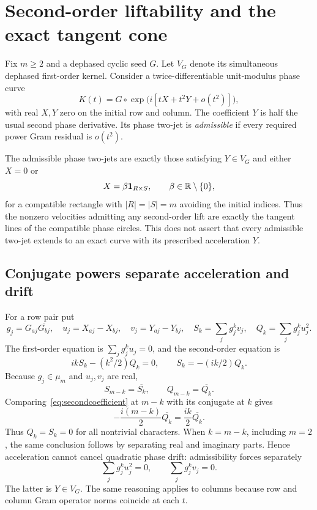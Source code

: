 \section{Second-order liftability and the exact tangent cone}\label{sec:second}
Fix $m\ge2$ and a dephased cyclic seed $G$. Let $V_G$ denote its simultaneous dephased first-order kernel. Consider a twice-differentiable unit-modulus phase curve
\[
 K(t)=G\circ\exp\bigl(i[tX+t^2Y+o(t^2)]\bigr),
\]
with real $X,Y$ zero on the initial row and column. The coefficient $Y$ is half the usual second phase derivative. Its phase two-jet is \emph{admissible} if every required power Gram residual is $o(t^2)$.

\begin{theorem}\label{thm:twojet}
The admissible phase two-jets are exactly those satisfying $Y\in V_G$ and either $X=0$ or
\[
 X=\beta\mathbf1_{R\times S},\qquad\beta\in\mathbb R\setminus\{0\},
\]
for a compatible rectangle with $|R|=|S|=m$ avoiding the initial indices. Thus the nonzero velocities admitting any second-order lift are exactly the tangent lines of the compatible phase circles. This does not assert that every admissible two-jet extends to an exact curve with its prescribed acceleration $Y$.
\end{theorem}

\subsection{Conjugate powers separate acceleration and drift}
For a row pair put
\[
 g_j=G_{aj}\overline{G_{bj}},\quad u_j=X_{aj}-X_{bj},\quad
 v_j=Y_{aj}-Y_{bj},\quad S_k=\sum_jg_j^kv_j,\quad Q_k=\sum_jg_j^ku_j^2.
\]
The first-order equation is $\sum_jg_j^ku_j=0$, and the second-order equation is
\begin{equation}\label{eq:secondcoefficient}
 ikS_k-(k^2/2)Q_k=0,\qquad S_k=-(ik/2)Q_k.
\end{equation}
Because $g_j\in\mu_m$ and $u_j,v_j$ are real,
\[
 S_{m-k}=\overline{S_k},\qquad Q_{m-k}=\overline{Q_k}.
\]
Comparing~\eqref{eq:secondcoefficient} at $m-k$ with its conjugate at $k$ gives
\[
 -\frac{i(m-k)}2\overline{Q_k}=\frac{ik}2\overline{Q_k}.
\]
Thus $Q_k=S_k=0$ for all nontrivial characters. When $k=m-k$, including $m=2$, the same conclusion follows by separating real and imaginary parts. Hence acceleration cannot cancel quadratic phase drift: admissibility forces separately
\begin{equation}\label{eq:secondseparation}
 \sum_jg_j^ku_j^2=0,\qquad\sum_jg_j^kv_j=0.
\end{equation}
The latter is $Y\in V_G$. The same reasoning applies to columns because row and column Gram operator norms coincide at each $t$.

